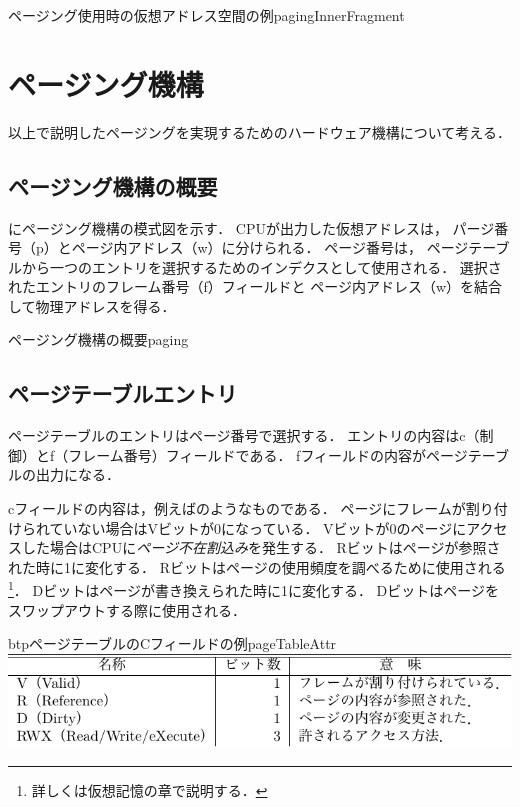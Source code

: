 {ページング使用時の仮想アドレス空間の例}{pagingInnerFragment}

\section{ページング機構}
以上で説明したページングを実現するためのハードウェア機構について考える．

\subsection{ページング機構の概要}
にページング機構の模式図を示す．
CPUが出力した仮想アドレスは，
パージ番号（p）とページ内アドレス（w）に分けられる．
ページ番号は，
ページテーブルから一つのエントリを選択するためのインデクスとして使用される．
選択されたエントリのフレーム番号（f）フィールドと
ページ内アドレス（w）を結合して物理アドレスを得る．

{ページング機構の概要}{paging}

\subsection{ページテーブルエントリ}
ページテーブルのエントリはページ番号で選択する．
エントリの内容はc（制御）とf（フレーム番号）フィールドである．
fフィールドの内容がページテーブルの出力になる．

cフィールドの内容は，例えばのようなものである．
ページにフレームが割り付けられていない場合はVビットが0になっている．
Vビットが0のページにアクセスした場合はCPUに\emph{ページ不在割込み}を発生する．
Rビットはページが参照された時に1に変化する．
Rビットはページの使用頻度を調べるために使用される\footnote{
詳しくは仮想記憶の章で説明する．}．
Dビットはページが書き換えられた時に1に変化する．
Dビットはページをスワップアウトする際に使用される．

\begin{mytable}{btp}{ページテーブルのCフィールドの例}{pageTableAttr}
  \includegraphics[scale=1.0]{Tbl/pageTableAttr.pdf}
\end{mytable}

